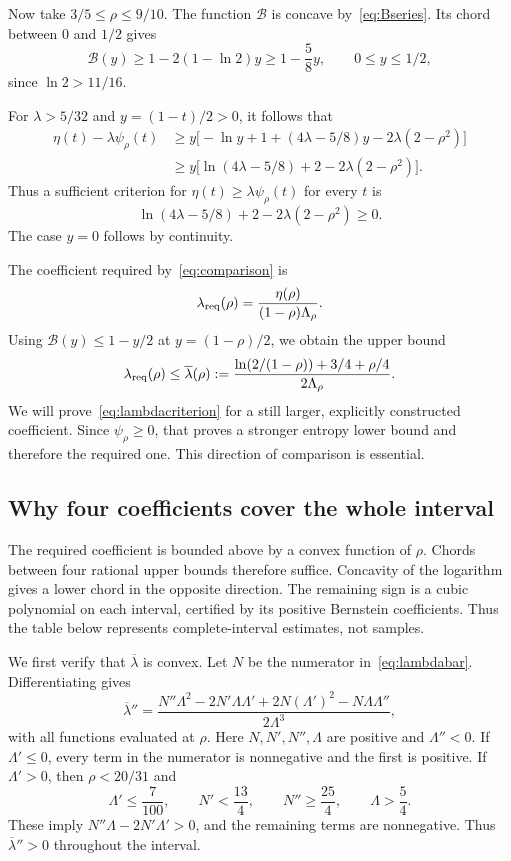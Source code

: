 Now take $3/5\le\rho\le9/10$. The function $\mathcal B$ is concave by~\eqref{eq:Bseries}. Its chord between $0$ and $1/2$ gives
\[
\mathcal B(y)\ge1-2(1-\ln2)y\ge1-\frac58y,
\qquad 0\le y\le1/2,
\]
since $\ln2>11/16$.

For $\lambda>5/32$ and $y=(1-t)/2>0$, it follows that
\begin{align*}
\eta(t)-\lambda\psi_\rho(t)
&\ge y\bigl[-\ln y+1+(4\lambda-5/8)y-2\lambda(2-\rho^2)\bigr]\\
&\ge y\bigl[\ln(4\lambda-5/8)+2-2\lambda(2-\rho^2)\bigr].
\end{align*}
Thus a sufficient criterion for $\eta(t)\ge\lambda\psi_\rho(t)$ for every $t$ is
\begin{equation}\label{eq:lambdacriterion}
\ln(4\lambda-5/8)+2-2\lambda(2-\rho^2)\ge0.
\end{equation}
The case $y=0$ follows by continuity.

The coefficient required by~\eqref{eq:comparison} is
\[
\lambda_{\rm req}(\rho)=\frac{\eta(\rho)}{(1-\rho)\Lambda_\rho}.
\]
Using $\mathcal B(y)\le1-y/2$ at $y=(1-\rho)/2$, we obtain the upper bound
\begin{equation}\label{eq:lambdabar}
\lambda_{\rm req}(\rho)\le\overline\lambda(\rho)
:=\frac{\ln(2/(1-\rho))+3/4+\rho/4}{2\Lambda_\rho}.
\end{equation}
We will prove~\eqref{eq:lambdacriterion} for a still larger, explicitly constructed coefficient. Since $\psi_\rho\ge0$, that proves a stronger entropy lower bound and therefore the required one. This direction of comparison is essential.

\subsection{Why four coefficients cover the whole interval}
The required coefficient is bounded above by a convex function of $\rho$. Chords between four rational upper bounds therefore suffice. Concavity of the logarithm gives a lower chord in the opposite direction. The remaining sign is a cubic polynomial on each interval, certified by its positive Bernstein coefficients. Thus the table below represents complete-interval estimates, not samples.

We first verify that $\overline\lambda$ is convex. Let $N$ be the numerator in~\eqref{eq:lambdabar}. Differentiating gives
\[
\overline\lambda''
=\frac{N''\Lambda^2-2N'\Lambda\Lambda'
+2N(\Lambda')^2-N\Lambda\Lambda''}{2\Lambda^3},
\]
with all functions evaluated at $\rho$. Here $N,N',N'',\Lambda$ are positive and $\Lambda''<0$. If $\Lambda'\le0$, every term in the numerator is nonnegative and the first is positive. If $\Lambda'>0$, then $\rho<20/31$ and
\[
\Lambda'\le\frac7{100},\qquad N'<\frac{13}{4},\qquad
N''\ge\frac{25}{4},\qquad \Lambda>\frac54.
\]
These imply $N''\Lambda-2N'\Lambda'>0$, and the remaining terms are nonnegative. Thus $\overline\lambda''>0$ throughout the interval.

